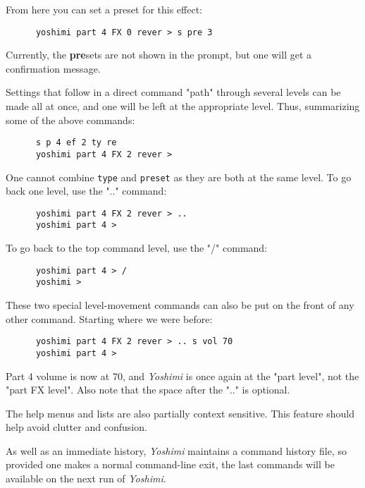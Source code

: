    From here you can set a preset for this effect:

   \begin{verbatim}
      yoshimi part 4 FX 0 rever > s pre 3
   \end{verbatim}

   Currently, the \textbf{pre}sets are not shown in the prompt, but one
   will get a confirmation message.

   Settings that follow in a direct command "path" through several levels
   can be made all at once, and one will be left at the appropriate level.
   Thus, summarizing some of the above commands:

   \begin{verbatim}
      s p 4 ef 2 ty re
      yoshimi part 4 FX 2 rever >
   \end{verbatim}

   One cannot combine \texttt{type} and \texttt{preset} as they
   are both at the same level.  To go back one level, use the
   ".." command:

   \begin{verbatim}
      yoshimi part 4 FX 2 rever > ..
      yoshimi part 4 >
   \end{verbatim}

   To go back to the top command level, use the "/" command:

   \begin{verbatim}
      yoshimi part 4 > /
      yoshimi >
   \end{verbatim}

   These two special level-movement commands can also be put on the front of
   any other command.  Starting where we were before:

   \begin{verbatim}
      yoshimi part 4 FX 2 rever > .. s vol 70
      yoshimi part 4 >
   \end{verbatim}

   Part 4 volume is now at 70, and \textsl{Yoshimi} is once again at the
   "part level", not the "part FX level".  Also note that the space after
   the ".." is optional.

   The help menus and lists are also partially context sensitive. This
   feature should help avoid clutter and confusion.

   As well as an immediate history, \textsl{Yoshimi} maintains a command
   history file, so provided one makes a normal command-line exit, the last
   commands will be available on the next run of \textsl{Yoshimi}.

